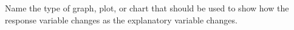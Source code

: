 \question[2]
Name the type of graph, plot, or chart that should be used to show how the response variable changes as the explanatory variable changes. 

